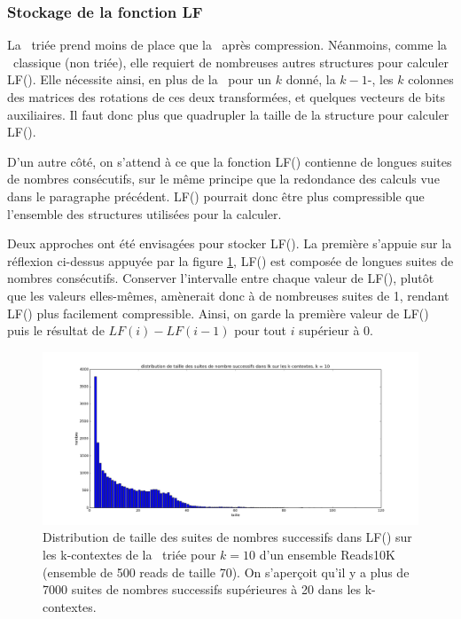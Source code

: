 \subsubsection{Stockage de la fonction LF}
La \kbwt\ triée prend moins de place que la \bwt\ après compression. Néanmoins, comme la \kbwt\ classique (non triée), elle requiert de nombreuses autres structures pour calculer LF(). Elle nécessite ainsi, en plus de la \kbwt\ pour un $k$ donné, la $k-1$-\bwt, les $k$ colonnes des matrices des rotations de ces deux transformées, et quelques vecteurs de bits auxiliaires. Il faut donc plus que quadrupler la taille de la structure pour calculer LF().

D'un autre côté, on s'attend à ce que la fonction LF() contienne de longues suites de nombres consécutifs, sur le même principe que la redondance des calculs vue dans le paragraphe précédent. LF() pourrait donc être plus compressible que l'ensemble des structures utilisées pour la calculer.

Deux approches ont été envisagées pour stocker LF(). La première s'appuie sur la réflexion ci-dessus appuyée par la figure \ref{suitesLF}, LF() est composée de longues suites de nombres consécutifs. Conserver l'intervalle entre chaque valeur de LF(), plutôt que les valeurs elles-mêmes, amènerait donc à de nombreuses suites de 1, rendant LF() plus facilement compressible. Ainsi, on garde la première valeur de LF() puis le résultat de $LF(i) - LF(i-1)$ pour tout $i$ supérieur à 0.

\begin{figure}[!ht]
    \center
    \includegraphics[scale = 0.3]{./images/suitesLFreads10K_k10.png}
    \caption{Distribution de taille des suites de nombres successifs dans LF() sur les k-contextes de la \kbwt\ triée pour $k = 10$ d'un ensemble Reads10K (ensemble de 500 reads de taille 70). On s'aperçoit qu'il y a plus de 7000 suites de nombres successifs supérieures à 20 dans les k-contextes.}
    \label{suitesLF}
\end{figure}

